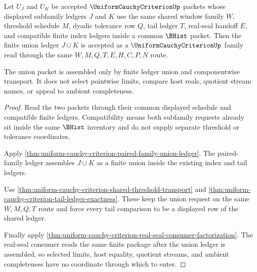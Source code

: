 \begin{theorem}
\label{thm:uniform-cauchy-criterion-family-union}
Let $U_J$ and $U_K$ be accepted $\UniformCauchyCriterionUp$ packets whose displayed subfamily ledgers $J$ and $K$ use the same shared window family $W$, threshold schedule $M$, dyadic tolerance row $Q$, tail ledger $T$, real-seal handoff $E$, and compatible finite index ledgers inside a common $\BHist$ packet. Then the finite union ledger $J\cup K$ is accepted as a $\UniformCauchyCriterionUp$ family read through the same $W,M,Q,T,E,H,C,P,N$ route.

The union packet is assembled only by finite ledger union and componentwise transport. It does not select pointwise limits, compare host reals, quotient stream names, or appeal to ambient completeness.
\end{theorem}
\begin{proof}
Read the two packets through their common displayed schedule and compatible finite ledgers. Compatibility means both subfamily requests already sit inside the same $\BHist$ inventory and do not supply separate threshold or tolerance coordinates.

Apply \autoref{thm:uniform-cauchy-criterion-paired-family-union-ledger}. The paired-family ledger assembles $J\cup K$ as a finite union inside the existing index and tail ledgers.

Use \autoref{thm:uniform-cauchy-criterion-shared-threshold-transport} and \autoref{thm:uniform-cauchy-criterion-tail-ledger-exactness}. These keep the union request on the same $W,M,Q,T$ route and force every tail comparison to be a displayed row of the shared ledger.

Finally apply \autoref{thm:uniform-cauchy-criterion-real-seal-consumer-factorization}. The real-seal consumer reads the same finite package after the union ledger is assembled, so selected limits, host equality, quotient streams, and ambient completeness have no coordinate through which to enter.
\end{proof}

